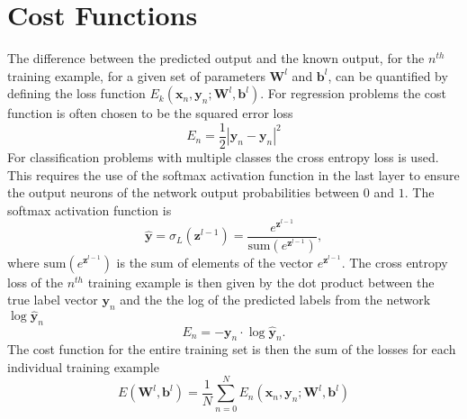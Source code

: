\documentclass{article}
\begin{document}
\section*{Cost Functions}
The difference between the predicted output and the known output, for the $n^{th}$ training example, for a given set of parameters $\textbf{W}^l$ and $\textbf{b}^l$, can be quantified by defining the loss function $E_k(\textbf{x}_n, \textbf{y}_n ; \textbf{W}^l, \textbf{b}^l)$. For regression problems the cost function is often chosen to be the squared error loss
\begin{equation}
E_n = \frac{1}{2} \left |\hat{\textbf{y}}_n - \textbf{y}_n \right|^2
\end{equation}
For classification problems with multiple classes the cross entropy loss is used. This requires the use of the softmax activation function in the last layer to ensure the output neurons of the network output probabilities between $0$ and $1$. The softmax activation function is
\begin{equation}
\hat{\textbf{y}} = \sigma_L(\textbf{z}^{l-1}) = \frac{e^{\textbf{z}^{l-1}}}{\text{sum} \left( e^{\textbf{z}^{l-1}} \right)},
\end{equation}
where $\text{sum} \left( e^{\textbf{z}^{l-1}} \right)$ is the sum of elements of the vector $e^{\textbf{z}^{l-1}}$. The cross entropy loss of the $n^{th}$ training example is then given by the dot product between the true label vector $\textbf{y}_n$ and the the log of the predicted labels from the network $\log{\hat{\textbf{y}}_n}$
\begin{equation}
E_n = - \textbf{y}_n \cdot \log{\hat{\textbf{y}}_n}.
\end{equation} 
The cost function for the entire training set is then the sum of the losses for each individual training example
\begin{equation}
E \left(\textbf{W}^l, \textbf{b}^l \right) = \frac{1}{N} \sum_{n=0}^N E_n(\textbf{x}_n, \textbf{y}_n ; \textbf{W}^l, \textbf{b}^l) 
\end{equation}
\end{document}
